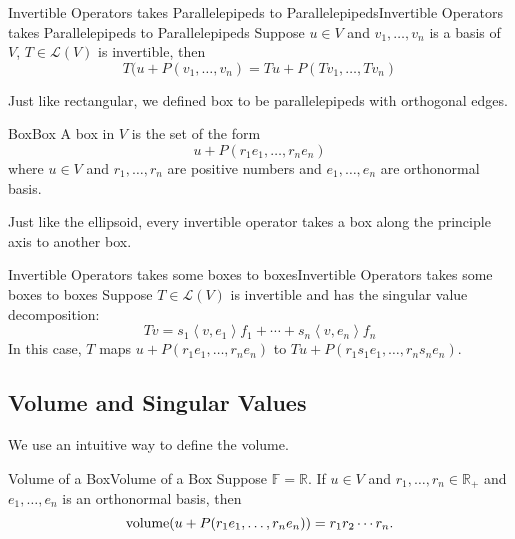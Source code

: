 \documentclass[../main.tex]{subfiles}
\begin{document}
\begin{theorem}{Invertible Operators takes Parallelepipeds to Parallelepipeds}{Invertible Operators takes Parallelepipeds to Parallelepipeds}
Suppose $u\in V$ and $v_1, \ldots ,v_n$ is a basis of $V$, $T\in \mathscr{L}(V)$ is invertible, then
\begin{equation*}
T(u+P(v_1, \ldots ,v_n) = Tu+P(Tv_1, \ldots ,Tv_n)
\end{equation*}
\end{theorem}

Just like rectangular, we defined box to be parallelepipeds with orthogonal edges.
\begin{definition}{Box}{Box}
A box in $V$ is the set of the form
\begin{equation*}
u+P(r_1e_1, \ldots ,r_ne_n)
\end{equation*}
where $u\in V$ and $r_1, \ldots ,r_n$ are positive numbers and $e_1, \ldots ,e_n$ are orthonormal basis.
\end{definition}

Just like the ellipsoid, every invertible operator takes a box along the principle axis to another box.

\begin{theorem}{Invertible Operators takes some boxes to boxes}{Invertible Operators takes some boxes to boxes}
Suppose $T\in \mathscr{L}(V)$ is invertible and has the singular value decomposition:
\begin{equation*}
Tv = s_1 \left<v,e_1\right>f_1 +\cdots +s_n \left<v,e_n\right>f_n
\end{equation*}
In this case, $T$ maps $u+P(r_1e_1, \ldots ,r_ne_n)$ to $Tu+P(r_1s_1e_1, \ldots ,r_ns_ne_n)$.
\end{theorem}


\subsection{Volume and Singular Values}

We use an intuitive way to define the volume.
\begin{definition}{Volume of a Box}{Volume of a Box}
Suppose $\mathbb{F}=\mathbb{R}$. If $u\in V$ and $r_1, \ldots ,r_n \in \mathbb{R}_+$ and $e_1, \ldots ,e_n$ is an orthonormal basis, then
\begin{equation}
\operatorname{volume} (u+P(r_1e_1, \ldots ,r_ne_n)) = r_1r_2 \cdots r_n.
\end{equation}
\end{definition}
\end{document}
